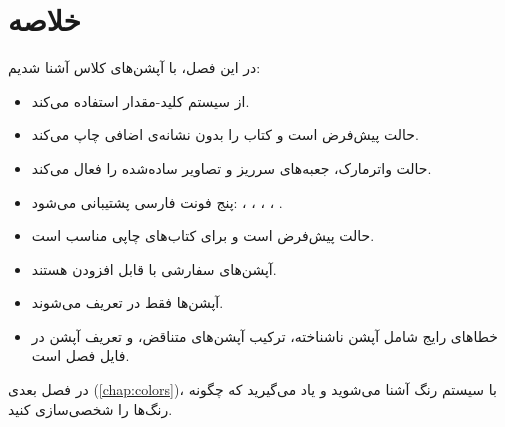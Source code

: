 \section{خلاصه}
\label{sec:options-summary}

در این فصل، با آپشن‌های کلاس 
آشنا شدیم:

\begin{itemize}
    \item {} از سیستم کلید-مقدار
     استفاده می‌کند.

    \item حالت  پیش‌فرض است و
    کتاب را بدون نشانه‌ی اضافی چاپ می‌کند.

    \item حالت  واترمارک، جعبه‌های
    سرریز و تصاویر ساده‌شده را فعال می‌کند.

    \item پنج فونت فارسی پشتیبانی می‌شود:
    ، ، ،
    ، .

    \item حالت  پیش‌فرض است و
    برای کتاب‌های چاپی مناسب است.

    \item آپشن‌های سفارشی با
     قابل افزودن هستند.

    \item آپشن‌ها فقط در 
    تعریف می‌شوند.

    \item خطاهای رایج شامل آپشن ناشناخته،
    ترکیب آپشن‌های متناقض، و تعریف آپشن در
    فایل فصل است.
\end{itemize}

در فصل بعدی (\cref{chap:colors})، با سیستم
رنگ  آشنا می‌شوید و یاد
می‌گیرید که چگونه رنگ‌ها را شخصی‌سازی
کنید.